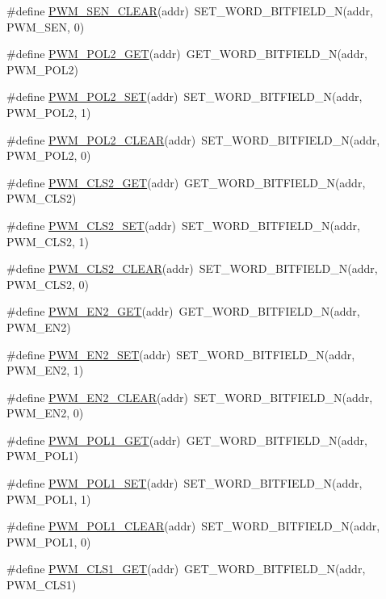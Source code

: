 \begin{DoxyCompactItemize}
\item 
\#define \hyperlink{a00564_a034aae47939380f387230201c7f1274e}{PWM\_\-SEN\_\-CLEAR}(addr)~SET\_\-WORD\_\-BITFIELD\_\-N(addr, PWM\_\-SEN, 0)
\item 
\#define \hyperlink{a00564_ac3861967d757bbe658bd178f22f1faf9}{PWM\_\-POL2\_\-GET}(addr)~GET\_\-WORD\_\-BITFIELD\_\-N(addr, PWM\_\-POL2)
\item 
\#define \hyperlink{a00564_a3cf36929a0204cf9b459b3baf53a8788}{PWM\_\-POL2\_\-SET}(addr)~SET\_\-WORD\_\-BITFIELD\_\-N(addr, PWM\_\-POL2, 1)
\item 
\#define \hyperlink{a00564_a36caff72143fa6007ee9252c30c22e22}{PWM\_\-POL2\_\-CLEAR}(addr)~SET\_\-WORD\_\-BITFIELD\_\-N(addr, PWM\_\-POL2, 0)
\item 
\#define \hyperlink{a00564_a3f38f44db6c84ac925932b3b8c7c3fbd}{PWM\_\-CLS2\_\-GET}(addr)~GET\_\-WORD\_\-BITFIELD\_\-N(addr, PWM\_\-CLS2)
\item 
\#define \hyperlink{a00564_af55cb269b9c76d640209e286c8f94ffc}{PWM\_\-CLS2\_\-SET}(addr)~SET\_\-WORD\_\-BITFIELD\_\-N(addr, PWM\_\-CLS2, 1)
\item 
\#define \hyperlink{a00564_a1ba0976f87cd390582bc472a8cf3d9e8}{PWM\_\-CLS2\_\-CLEAR}(addr)~SET\_\-WORD\_\-BITFIELD\_\-N(addr, PWM\_\-CLS2, 0)
\item 
\#define \hyperlink{a00564_aa0de269e9d261e256c561e5143bcef78}{PWM\_\-EN2\_\-GET}(addr)~GET\_\-WORD\_\-BITFIELD\_\-N(addr, PWM\_\-EN2)
\item 
\#define \hyperlink{a00564_a56aefca82f7d7b5edb18bdaebea0db6a}{PWM\_\-EN2\_\-SET}(addr)~SET\_\-WORD\_\-BITFIELD\_\-N(addr, PWM\_\-EN2, 1)
\item 
\#define \hyperlink{a00564_a2684de4c2445d0662924e1c73f923fad}{PWM\_\-EN2\_\-CLEAR}(addr)~SET\_\-WORD\_\-BITFIELD\_\-N(addr, PWM\_\-EN2, 0)
\item 
\#define \hyperlink{a00564_a99bdcd1c7117714230d87bca18ed71eb}{PWM\_\-POL1\_\-GET}(addr)~GET\_\-WORD\_\-BITFIELD\_\-N(addr, PWM\_\-POL1)
\item 
\#define \hyperlink{a00564_a34cd56e735c1f620b6dfffad6128a3c5}{PWM\_\-POL1\_\-SET}(addr)~SET\_\-WORD\_\-BITFIELD\_\-N(addr, PWM\_\-POL1, 1)
\item 
\#define \hyperlink{a00564_a4b189c63bdda09213e5d5315da80384c}{PWM\_\-POL1\_\-CLEAR}(addr)~SET\_\-WORD\_\-BITFIELD\_\-N(addr, PWM\_\-POL1, 0)
\item 
\#define \hyperlink{a00564_abcd88bc573372dee69fab4cee42e67a4}{PWM\_\-CLS1\_\-GET}(addr)~GET\_\-WORD\_\-BITFIELD\_\-N(addr, PWM\_\-CLS1)
\item 

\end{DoxyCompactItemize}
